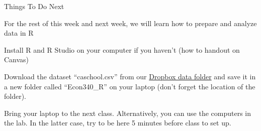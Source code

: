 \documentclass{./../div_teaching_slides}
\begin{document}
%


\begin{frame}{Things To Do Next}
\vspace{-0.5em}
\begin{witemize}
\item For the rest of this week and next week, we will learn how to prepare and analyze data in R
\item Install R and R Studio on your computer if you haven't (how to handout on Canvas)
\item Download the dataset ``caschool.csv'' from our \href{https://www.dropbox.com/sh/9x7ac4qwnddl650/AAAP1FdTpFp2rXyZ6t-9-qqTa?dl=0}{Dropbox data folder} and save it in a new folder called ``Econ340\_R'' on your laptop (don't forget the location of the folder).
\item Bring your laptop to the next class. Alternatively, you can use the computers in the lab. In the latter case, try to be here 5 minutes before class to set up.
\end{witemize}
\end{frame}
\end{document}
